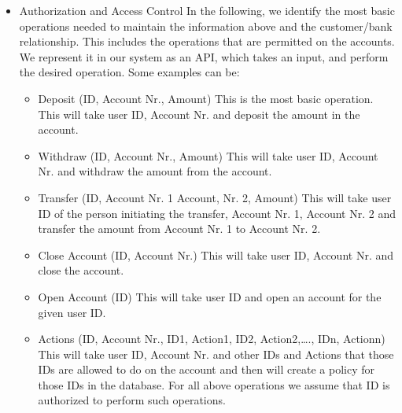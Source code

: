 \begin{itemize}
\item Authorization and Access Control
In the following, we identify the most basic operations needed to maintain the information above and the customer/bank relationship. This includes the operations that are permitted on the accounts. We represent it in our system as an API, which takes an input, and perform the desired operation. Some examples can be:
\begin{itemize}
\item Deposit (ID, Account Nr., Amount)
This is the most basic operation. This will take user ID, Account Nr. and deposit the amount in the account.
\item Withdraw (ID, Account Nr., Amount)
This will take user ID, Account Nr. and withdraw the amount from the account.
\item Transfer (ID, Account Nr. 1 Account, Nr. 2, Amount)
This will take user ID of the person initiating the transfer, Account Nr. 1, Account Nr. 2 and transfer the amount from Account Nr. 1 to Account Nr. 2.
\item Close Account (ID, Account Nr.)
This will take user ID, Account Nr. and close the account.
\item Open Account (ID)
This will take user ID and open an account for the given user ID.
\item Actions (ID, Account Nr., ID1, Action1, ID2, Action2,…., IDn, Actionn)
This will take user ID, Account Nr. and other IDs and Actions that those IDs are allowed to do on the account and then will create a policy for those IDs in the database.
For all above operations we assume that ID is authorized to perform such operations.
\end{itemize}
\end{itemize} 